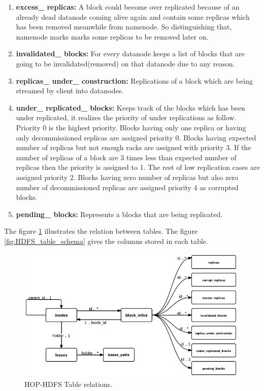 \begin{enumerate}
\item \textbf{excess\_ replicas:} A  block   could  become  over replicated because of an already  dead
datanode  coming  alive  again  and  contain  some  replicas   which  has   been  removed
meanwhile  from   namenode.  So  distinguishing  that,  namenode  marks   marks   some
replicas to be removed later on.

\item \textbf{invalidated\_ blocks:} For  every   datanode  keeps   a  list  of  blocks   that  are  going  to  be
invalidated(removed) on that datanode due to any reason.

\item \textbf{replicas\_ under\_ construction:} Replications   of  a  block   which  are  being  streamed  by
client into datanodes.

\item \textbf{under\_ replicated\_ blocks:} Keeps   track   of  the  blocks   which  has   been  under
replicated,  it  realizes   the  priority   of  under  replications   as   follow.  Priority   0  is   the
highest  priority.  Blocks   having  only   one  replica  or  having  only   decommissioned
replicas   are  assigned  priority   0.  Blocks   having  expected  number  of  replicas   but  not
enough  racks   are  assigned  with  priority   3.  If  the  number  of  replicas   of  a  block   are  3
times   less   than  expected  number  of  replicas   then  the  priority   is   assigned  to  1.  The
rest  of  low  replication  cases   are  assigned  priority   2.  Blocks   having  zero  number  of
replicas   but  also  zero  number  of  decommissioned replicas  are assigned priority  4 as
corrupted blocks.

\item \textbf{pending\_ blocks:} Represents a blocks that are being replicated.

\end{enumerate}
 The figure \ref{fig:HDFS_table_relation} illustrates the relation between tables. The figure \ref{fig:HDFS_table_schema} gives the columns stored in each table.
\begin{figure}
  \centering
 \includegraphics[scale=0.5]{figs/preliminar/HOP_table_relation.png}
  \caption{HOP-HDFS Table relations.}
  \label{fig:HDFS_table_relation}
\end{figure}
